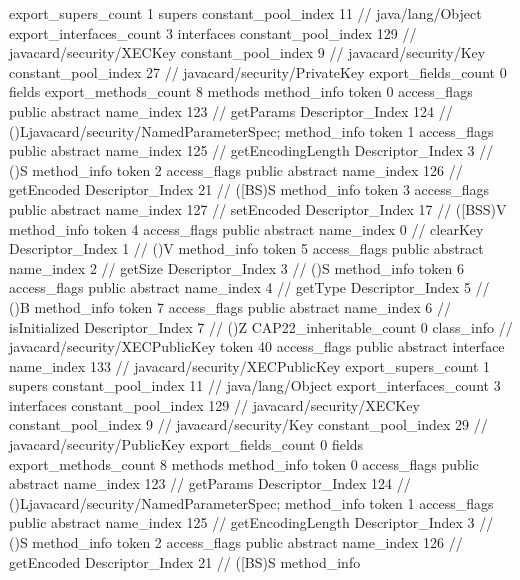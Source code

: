 {{{			export_supers_count	1
			supers {
				constant_pool_index	11		// java/lang/Object
			}
			export_interfaces_count	3
			interfaces {
				constant_pool_index	129		// javacard/security/XECKey
				constant_pool_index	9		// javacard/security/Key
				constant_pool_index	27		// javacard/security/PrivateKey
			}
			export_fields_count	0
			fields {
			}
			export_methods_count	8
			methods {
				method_info {
					token	0
					access_flags	public abstract
					name_index	123		// getParams
					Descriptor_Index	124		// ()Ljavacard/security/NamedParameterSpec;
				}
				method_info {
					token	1
					access_flags	public abstract
					name_index	125		// getEncodingLength
					Descriptor_Index	3		// ()S
				}
				method_info {
					token	2
					access_flags	public abstract
					name_index	126		// getEncoded
					Descriptor_Index	21		// ([BS)S
				}
				method_info {
					token	3
					access_flags	public abstract
					name_index	127		// setEncoded
					Descriptor_Index	17		// ([BSS)V
				}
				method_info {
					token	4
					access_flags	public abstract
					name_index	0		// clearKey
					Descriptor_Index	1		// ()V
				}
				method_info {
					token	5
					access_flags	public abstract
					name_index	2		// getSize
					Descriptor_Index	3		// ()S
				}
				method_info {
					token	6
					access_flags	public abstract
					name_index	4		// getType
					Descriptor_Index	5		// ()B
				}
				method_info {
					token	7
					access_flags	public abstract
					name_index	6		// isInitialized
					Descriptor_Index	7		// ()Z
				}
			}
			CAP22_inheritable_count	0
		}
		class_info {		// javacard/security/XECPublicKey
			token	40
			access_flags	public abstract interface
			name_index	133		// javacard/security/XECPublicKey
			export_supers_count	1
			supers {
				constant_pool_index	11		// java/lang/Object
			}
			export_interfaces_count	3
			interfaces {
				constant_pool_index	129		// javacard/security/XECKey
				constant_pool_index	9		// javacard/security/Key
				constant_pool_index	29		// javacard/security/PublicKey
			}
			export_fields_count	0
			fields {
			}
			export_methods_count	8
			methods {
				method_info {
					token	0
					access_flags	public abstract
					name_index	123		// getParams
					Descriptor_Index	124		// ()Ljavacard/security/NamedParameterSpec;
				}
				method_info {
					token	1
					access_flags	public abstract
					name_index	125		// getEncodingLength
					Descriptor_Index	3		// ()S
				}
				method_info {
					token	2
					access_flags	public abstract
					name_index	126		// getEncoded
					Descriptor_Index	21		// ([BS)S
				}
				method_info {
}}}}}
